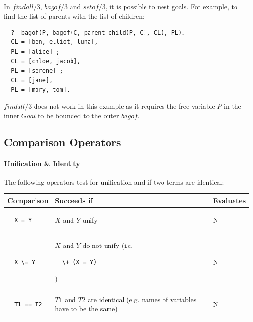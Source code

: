 \documentclass{article}
\begin{document}
\begin{multicols}{2}
  \paragraph{} In $findall/3$, $bagof/3$ and $setof/3$, it is possible to nest goals. For example, to find the list of parents with the list of children:
  
  \begin{lstlisting}
  ?- bagof(P, bagof(C, parent_child(P, C), CL), PL).
  CL = [ben, elliot, luna],
  PL = [alice] ;
  CL = [chloe, jacob],
  PL = [serene] ;
  CL = [jane],
  PL = [mary, tom].
  \end{lstlisting}
  
  $findall/3$ does not work in this example as it requires the free variable $P$ in the inner $Goal$ to  be bounded to the outer $bagof$.
  
  \subsection{Comparison Operators}
  
  \paragraph{Unification \& Identity} The following operators test for unification and if two terms are identical:
  
  \noindent \begin{tabular}{ | p{2cm} | p{4cm} | p{1.4cm} | }
  \hline
  \bf Comparison & \bf Succeeds if & \bf Evaluates \\
  \hline
  
  \begin{lstlisting}
  X = Y
  \end{lstlisting} & $X$ and $Y$ unify & N \\
  \hline  
  
  \begin{lstlisting}
  X \= Y
  \end{lstlisting} & $X$ and $Y$ do not unify (i.e. 
  \begin{lstlisting}
  \+ (X = Y)
  \end{lstlisting}) & N \\
  \hline
  
  \begin{lstlisting}
  T1 == T2
  \end{lstlisting} & $T1$ and $T2$ are identical (e.g. names of variables have to be the same)& N \\
  \hline
  

\end{tabular}
\end{multicols}
\end{document}
